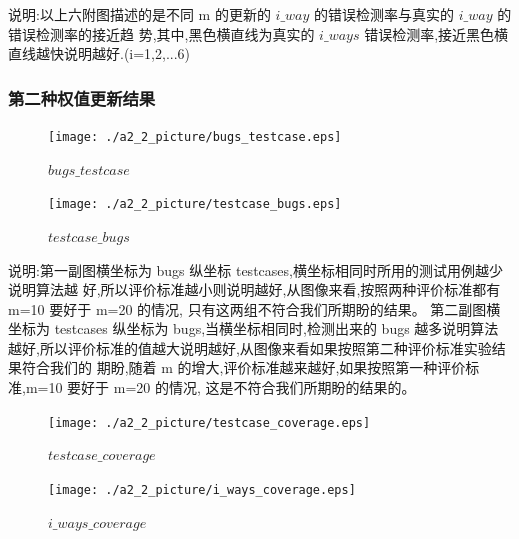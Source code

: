 \documentclass[10pt,journal,letterpaper,compsoc]{IEEEtran}
\begin{document}
\begin{CJK}{UTF8}{gkai}
说明:以上六附图描述的是不同 m 的更新的 $i\_way$ 的错误检测率与真实的 $i\_way$ 的错误检测率的接近趋
势,其中,黑色横直线为真实的 $i\_ways$ 错误检测率,接近黑色横直线越快说明越好.(i=1,2,...6)

    \subsubsection*{第二种权值更新结果}
 \begin{figure}[htb]
   \centering
   \texttt{[image: ./a2\_2\_picture/bugs\_testcase.eps]}
   \caption{$bugs\_testcase$}
   \label{fig:ARCH}
 \end{figure}
 \begin{figure}[htb]
   \centering
   \texttt{[image: ./a2\_2\_picture/testcase\_bugs.eps]}
   \caption{$testcase\_bugs$}
   \label{fig:ARCH}
 \end{figure}

说明:第一副图横坐标为 bugs 纵坐标 testcases,横坐标相同时所用的测试用例越少说明算法越
好,所以评价标准越小则说明越好,从图像来看,按照两种评价标准都有 m=10 要好于 m=20 的情况,
只有这两组不符合我们所期盼的结果。
第二副图横坐标为 testcases 纵坐标为 bugs,当横坐标相同时,检测出来的 bugs 越多说明算法
越好,所以评价标准的值越大说明越好,从图像来看如果按照第二种评价标准实验结果符合我们的
期盼,随着 m 的增大,评价标准越来越好,如果按照第一种评价标准,m=10 要好于 m=20 的情况,
这是不符合我们所期盼的结果的。
 \begin{figure}[htb]
   \centering
   \texttt{[image: ./a2\_2\_picture/testcase\_coverage.eps]}
   \caption{$testcase\_coverage$}
   \label{fig:ARCH}
 \end{figure}
 \begin{figure}[htb]
   \centering
   \texttt{[image: ./a2\_2\_picture/i\_ways\_coverage.eps]}
   \caption{$i\_ways\_coverage$}
   \label{fig:ARCH}
 \end{figure}


\end{CJK}
\end{document}
